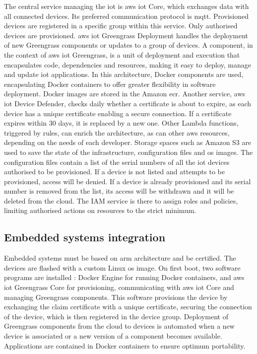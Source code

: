 The central service managing the \acrshort{iot} is \gls{aws} \acrshort{iot} Core, which exchanges data with all connected devices. Its preferred communication protocol is \acrshort{mqtt}. Provisioned devices are registered in a specific group within this service. Only authorised devices are provisioned. \gls{aws} \acrshort{iot} Greengrass Deployment handles the deployment of new Greengrass components or updates to a group of devices. A component, in the context of \gls{aws} \acrshort{iot} Greengrass, is a unit of deployment and execution that encapsulates code, dependencies and resources, making it easy to deploy, manage and update \acrshort{iot} applications. In this architecture, Docker components are used, encapsulating Docker containers to offer greater flexibility in software deployment. Docker images are stored in the Amazon \acrfull{ecr}. Another service, \gls{aws} \acrshort{iot} Device Defender, checks daily whether a certificate is about to expire, as each device has a unique certificate enabling a secure connection. If a certificate expires within 30 days, it is replaced by a new one. Other Lambda functions, triggered by rules, can enrich the architecture, as can other \gls{aws} resources, depending on the needs of each developer. Storage spaces such as Amazon S3 are used to save the state of the infrastructure, configuration files and \acrshort{os} images. The configuration files contain a list of the serial numbers of all the \acrshort{iot} devices authorised to be provisioned. If a device is not listed and attempts to be provisioned, access will be denied. If a device is already provisioned and its serial number is removed from the list, its access will be withdrawn and it will be deleted from the \gls{cloud}. The IAM service is there to assign roles and policies, limiting authorised actions on resources to the strict minimum.

\subsection{Embedded systems integration}
Embedded systems must be based on \gls{arm} architecture and be  certified. The devices are flashed with a custom Linux \acrshort{os} image. On first boot, two software programs are installed : Docker Engine for running Docker containers, and \gls{aws} \acrshort{iot} Greengrass Core for \gls{provisioning}, communicating with \gls{aws} \acrshort{iot} Core and managing Greengrass components. This software provisions the device by exchanging the claim certificate with a unique certificate, securing the connection of the device, which is then registered in the device group. Deployment of Greengrass components from the \gls{cloud} to devices is automated when a new device is associated or a new version of a component becomes available. Applications are contained in Docker containers to ensure optimum portability.


